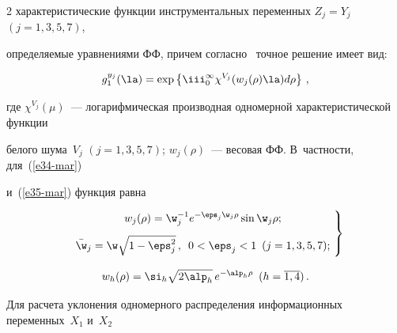 \begin{multicols}{2}
характеристические функции инструментальных переменных $Z_j =Y_j$ $(j=1,3,5,7)$, 


определяемые уравнениями ФФ, причем согласно~\cite{11-mar} точное решение имеет вид:


\begin{equation}


g_1^{y_j}(\la)=\exp\left \{ \iii_0^\infty \chi^{V_j} (w_j (\rho)\la)d\rho\right\}\,,


\label{e45-mar}


\end{equation}


где $\chi^{V_j}(\mu)$~--- логарифмическая производная одномерной характеристической функции


белого шума~$V_j$ $(j=1,3,5,7)$; $w_j(\rho)$~--- весовая ФФ. В~част\-ности, для~(\ref{e34-mar}) 


и~(\ref{e35-mar}) функция равна


    \begin{equation}


    \left.


    \begin{array}{c}


    w_j (\rho) =\w_j^{-1}  e^{-\eps_j \w_j \rho} \sin \w_j\rho;\\[9pt]


    \bar \w_j = \w \sqrt{1-\eps_j^2}\,,\enskip


    0<\eps_j<1\enskip (j=1,3,5,7);


    \end{array}\!


    \right\}\!


    \label{e46-mar}


    \end{equation}





\noindent


\begin{equation*}


w_h (\rho) =\si_h \sqrt{2\alp_h}\, e^{-\alp_h \rho} \enskip ( h=\overline{1,4})\,.




\end{equation*}





Для расчета уклонения одномерного распределения информационных переменных~$X_1$ и~$X_2$



\end{multicols}

